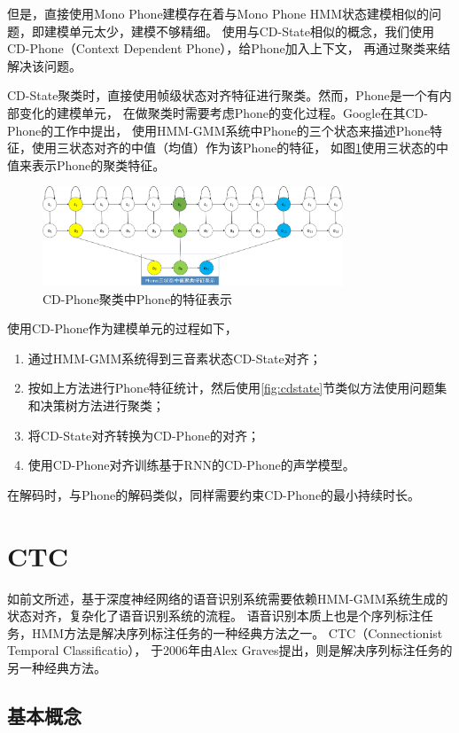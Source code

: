 但是，直接使用Mono Phone建模存在着与Mono Phone HMM状态建模相似的问题，即建模单元太少，建模不够精细。
使用与CD-State相似的概念，我们使用CD-Phone（Context Dependent Phone），给Phone加入上下文，
再通过聚类来结解决该问题。

CD-State聚类时，直接使用帧级状态对齐特征进行聚类。然而，Phone是一个有内部变化的建模单元，
在做聚类时需要考虑Phone的变化过程。Google在其CD-Phone的工作中提出，
使用HMM-GMM系统中Phone的三个状态来描述Phone特征，使用三状态对齐的中值（均值）作为该Phone的特征，
如图\ref{fig:3middle}使用三状态的中值来表示Phone的聚类特征。

\begin{figure}
\centering
\includegraphics[width=0.8\textwidth]{figures/chapter4/3middle-crop}
\caption{CD-Phone聚类中Phone的特征表示}
\label{fig:3middle}
\end{figure}


使用CD-Phone作为建模单元的过程如下，
\begin{enumerate}
\item 通过HMM-GMM系统得到三音素状态CD-State对齐；
\item 按如上方法进行Phone特征统计，然后使用\ref{fig:cdstate}节类似方法使用问题集和决策树方法进行聚类；
\item 将CD-State对齐转换为CD-Phone的对齐；
\item 使用CD-Phone对齐训练基于RNN的CD-Phone的声学模型。
\end{enumerate}
在解码时，与Phone的解码类似，同样需要约束CD-Phone的最小持续时长。


\section{CTC}

如前文所述，基于深度神经网络的语音识别系统需要依赖HMM-GMM系统生成的状态对齐，复杂化了语音识别系统的流程。
语音识别本质上也是个序列标注任务，HMM方法是解决序列标注任务的一种经典方法之一。
CTC（Connectionist Temporal Classificatio），
于2006年由Alex Graves提出，则是解决序列标注任务的另一种经典方法。

\subsection{基本概念}

